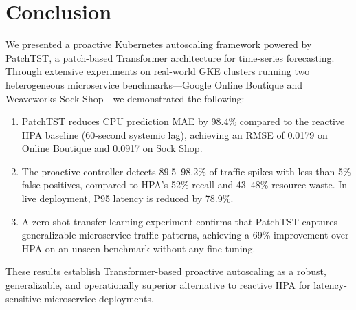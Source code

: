 \documentclass[conference]{IEEEtran}
\begin{document}
\section{Conclusion}\label{sec:conclusion}

We presented a proactive Kubernetes autoscaling framework powered by PatchTST, a patch-based Transformer architecture for time-series forecasting. Through extensive experiments on real-world GKE clusters running two heterogeneous microservice benchmarks---Google Online Boutique and Weaveworks Sock Shop---we demonstrated the following:

\begin{enumerate}
    \item PatchTST reduces CPU prediction MAE by 98.4\% compared to the reactive HPA baseline (60-second systemic lag), achieving an RMSE of 0.0179 on Online Boutique and 0.0917 on Sock Shop.
    \item The proactive controller detects 89.5--98.2\% of traffic spikes with less than 5\% false positives, compared to HPA's 52\% recall and 43--48\% resource waste. In live deployment, P95 latency is reduced by 78.9\%.
    \item A zero-shot transfer learning experiment confirms that PatchTST captures generalizable microservice traffic patterns, achieving a 69\% improvement over HPA on an unseen benchmark without any fine-tuning.
\end{enumerate}

These results establish Transformer-based proactive autoscaling as a robust, generalizable, and operationally superior alternative to reactive HPA for latency-sensitive microservice deployments.
\end{document}

